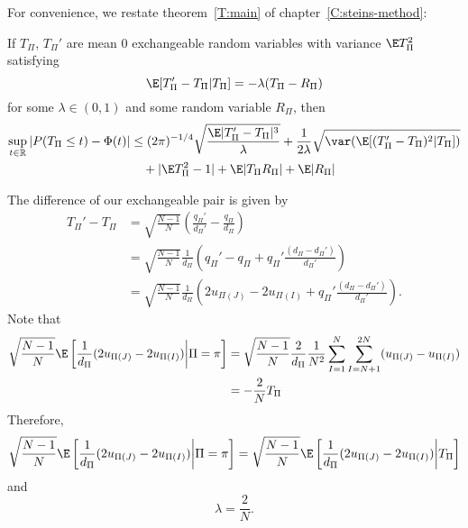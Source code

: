 For convenience, we restate theorem~\ref{T:main} of chapter~\ref{C:steins-method}:
\begin{thma}
  If $T_{\Pi}$, $T_{\Pi}'$ are mean 0 exchangeable random variables with variance $\E T_{\Pi}^2$
  satisfying
  \begin{equation*}
    \E[T_{\Pi}'-T_{\Pi}|T_{\Pi}] = -\lambda(T_{\Pi}-R_{\Pi})    
  \end{equation*}
  for some $\lambda \in (0,1)$ and some random variable $R_{\Pi}$, then 
  \begin{equation*}
    \begin{split}
      \sup_{t \in \mathbb{R}} |P(T_{\Pi} \leq t) - \Phi(t)|
      &\leq (2\pi)^{-1/4} \sqrt{\frac{\E |T_{\Pi}'-T_{\Pi}|^3}{\lambda}}
      + \frac{1}{2\lambda} \sqrt{\var (\E [(T_{\Pi}'-T_{\Pi})^2|T_{\Pi}])} \\
      &\quad + |\E T_{\Pi}^2 - 1| + \E |T_{\Pi}R_{\Pi}| + \E |R_{\Pi}|
    \end{split}
  \end{equation*}
\end{thma}

The difference of our exchangeable pair is given by
\begin{align}
  T_{\Pi}' - T_{\Pi}
  &= \sqrt{\frac{N-1}{N}}\left (\frac{q_{\Pi}'}{d_{\Pi}'}-\frac{q_{\Pi}}{d_{\Pi}}\right )
  \nonumber \\
  &= \sqrt{\frac{N-1}{N}}\frac{1}{d_{\Pi}}\left (q_{\Pi}' - q_{\Pi} +
    q_{\Pi}' \frac{(d_{\Pi}-d_{\Pi}')}{d_{\Pi}'}\right ) \nonumber \\
  &= \sqrt{\frac{N-1}{N}}\frac{1}{d_{\Pi}}\left
    (2u_{\Pi(J)} - 2u_{\Pi(I)} + q_{\Pi}' \frac{(d_{\Pi}-d_{\Pi}')}{d_{\Pi}'}\right ). \label{def:ttpcubed}
\end{align}
Note that 
\begin{align*}
  \sqrt{\frac{N-1}{N}} \E \left [ \frac{1}{d_{\Pi}} (2u_{\Pi(J)} - 2u_{\Pi(I)}) \middle | \Pi = \pi \right ] 
  &= \sqrt{\frac{N-1}{N}} \frac{2}{d_{\Pi}} \frac{1}{N^2} \sum_{I=1}^N \sum_{I=N+1}^{2N} (u_{\Pi(J)}-u_{\Pi(I)}) \\
  &= -\frac{2}{N} T_{\Pi}
\end{align*}
Therefore, 
\begin{equation*}
  \sqrt{\frac{N-1}{N}} \E \left [ \frac{1}{d_{\Pi}} (2u_{\Pi(J)} - 2u_{\Pi(I)}) \middle | \Pi = \pi \right ]
  = \sqrt{\frac{N-1}{N}} \E \left [ \frac{1}{d_{\Pi}} (2u_{\Pi(J)} - 2u_{\Pi(I)}) \middle | T_{\Pi} \right ]
\end{equation*}
and
\begin{equation*}
  \lambda = \frac{2}{N}.
\end{equation*}

